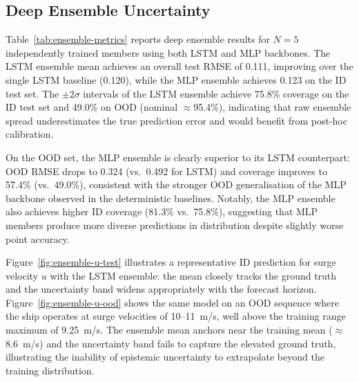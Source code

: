 \documentclass[a4paper,fleqn]{cas-sc}
\begin{document}
\subsection{Deep Ensemble Uncertainty}

Table~\ref{tab:ensemble-metrics} reports deep ensemble results for $N=5$ independently trained members using both LSTM and MLP backbones. The LSTM ensemble mean achieves an overall test RMSE of 0.111, improving over the single LSTM baseline (0.120), while the MLP ensemble achieves 0.123 on the ID test set. The $\pm2\sigma$ intervals of the LSTM ensemble achieve 75.8\% coverage on the ID test set and 49.0\% on OOD (nominal $\approx$95.4\%), indicating that raw ensemble spread underestimates the true prediction error and would benefit from post-hoc calibration.

On the OOD set, the MLP ensemble is clearly superior to its LSTM counterpart: OOD RMSE drops to 0.324 (vs.\ 0.492 for LSTM) and coverage improves to 57.4\% (vs.\ 49.0\%), consistent with the stronger OOD generalisation of the MLP backbone observed in the deterministic baselines. Notably, the MLP ensemble also achieves higher ID coverage (81.3\% vs.\ 75.8\%), suggesting that MLP members produce more diverse predictions in distribution despite slightly worse point accuracy.

Figure~\ref{fig:ensemble-u-test} illustrates a representative ID prediction for surge velocity $u$ with the LSTM ensemble: the mean closely tracks the ground truth and the uncertainty band widens appropriately with the forecast horizon. Figure~\ref{fig:ensemble-u-ood} shows the same model on an OOD sequence where the ship operates at surge velocities of 10--11~m/s, well above the training range maximum of 9.25~m/s. The ensemble mean anchors near the training mean ($\approx$8.6~m/s) and the uncertainty band fails to capture the elevated ground truth, illustrating the inability of epistemic uncertainty to extrapolate beyond the training distribution.
\end{document}
